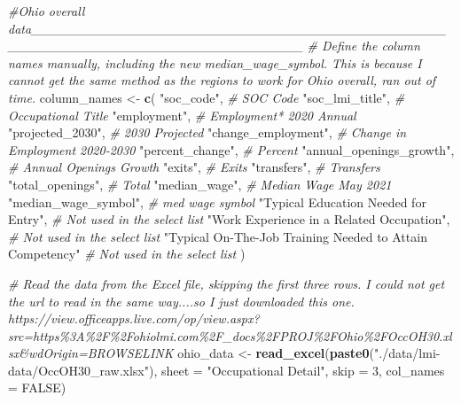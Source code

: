 \documentclass[
]{article}
\newenvironment{Shaded}{\begin{snugshade}}{\end{snugshade}}
\newcommand{\AttributeTok}[1]{\textcolor[rgb]{0.13,0.29,0.53}{#1}}
\newcommand{\CommentTok}[1]{\textcolor[rgb]{0.56,0.35,0.01}{\textit{#1}}}
\newcommand{\ConstantTok}[1]{\textcolor[rgb]{0.56,0.35,0.01}{#1}}
\newcommand{\DecValTok}[1]{\textcolor[rgb]{0.00,0.00,0.81}{#1}}
\newcommand{\FunctionTok}[1]{\textcolor[rgb]{0.13,0.29,0.53}{\textbf{#1}}}
\newcommand{\NormalTok}[1]{#1}
\newcommand{\OtherTok}[1]{\textcolor[rgb]{0.56,0.35,0.01}{#1}}
\newcommand{\StringTok}[1]{\textcolor[rgb]{0.31,0.60,0.02}{#1}}
\begin{document}
\begin{Shaded}
\begin{Highlighting}[]
\CommentTok{\#Ohio overall data\_\_\_\_\_\_\_\_\_\_\_\_\_\_\_\_\_\_\_\_\_\_\_\_\_\_\_\_\_\_\_\_\_\_\_\_\_\_\_\_\_\_\_\_\_\_\_\_\_\_\_\_\_\_\_\_\_\_\_\_\_\_\_\_\_\_\_\_\_\_\_\_\_\_\_\_\_}
\CommentTok{\# Define the column names manually, including the new \textquotesingle{}median\_wage\_symbol\textquotesingle{}. This is because I cannot get the same method as the regions to work for Ohio overall, ran out of time. }
\NormalTok{column\_names }\OtherTok{\textless{}{-}} \FunctionTok{c}\NormalTok{(}
  \StringTok{"soc\_code"}\NormalTok{,                    }\CommentTok{\# SOC Code}
  \StringTok{"soc\_lmi\_title"}\NormalTok{,               }\CommentTok{\# Occupational Title}
  \StringTok{"employment"}\NormalTok{,                  }\CommentTok{\# Employment* 2020 Annual}
  \StringTok{"projected\_2030"}\NormalTok{,              }\CommentTok{\# 2030 Projected}
  \StringTok{"change\_employment"}\NormalTok{,           }\CommentTok{\# Change in Employment 2020{-}2030}
  \StringTok{"percent\_change"}\NormalTok{,              }\CommentTok{\# Percent}
  \StringTok{"annual\_openings\_growth"}\NormalTok{,      }\CommentTok{\# Annual Openings Growth}
  \StringTok{"exits"}\NormalTok{,                       }\CommentTok{\# Exits}
  \StringTok{"transfers"}\NormalTok{,                   }\CommentTok{\# Transfers}
  \StringTok{"total\_openings"}\NormalTok{,              }\CommentTok{\# Total}
  \StringTok{"median\_wage"}\NormalTok{,                 }\CommentTok{\# Median Wage May 2021}
  \StringTok{"median\_wage\_symbol"}\NormalTok{,          }\CommentTok{\# med wage symbol}
  \StringTok{"Typical Education Needed for Entry"}\NormalTok{,    }\CommentTok{\# Not used in the select list}
  \StringTok{"Work Experience in a Related Occupation"}\NormalTok{,    }\CommentTok{\# Not used in the select list}
  \StringTok{"Typical On{-}The{-}Job Training Needed to Attain Competency"} \CommentTok{\# Not used in the select list}
\NormalTok{)}


\CommentTok{\# Read the data from the Excel file, skipping the first three rows. I could not get the url to read in the same way....so I just downloaded this one. https://view.officeapps.live.com/op/view.aspx?src=https\%3A\%2F\%2Fohiolmi.com\%2F\_docs\%2FPROJ\%2FOhio\%2FOccOH30.xlsx\&wdOrigin=BROWSELINK}
\NormalTok{ohio\_data }\OtherTok{\textless{}{-}} \FunctionTok{read\_excel}\NormalTok{(}\FunctionTok{paste0}\NormalTok{(}\StringTok{"./data/lmi{-}data/OccOH30\_raw.xlsx"}\NormalTok{), }
                        \AttributeTok{sheet =} \StringTok{"Occupational Detail"}\NormalTok{, }\AttributeTok{skip =} \DecValTok{3}\NormalTok{, }\AttributeTok{col\_names =} \ConstantTok{FALSE}\NormalTok{)}
\end{Highlighting}
\end{Shaded}
\end{document}
